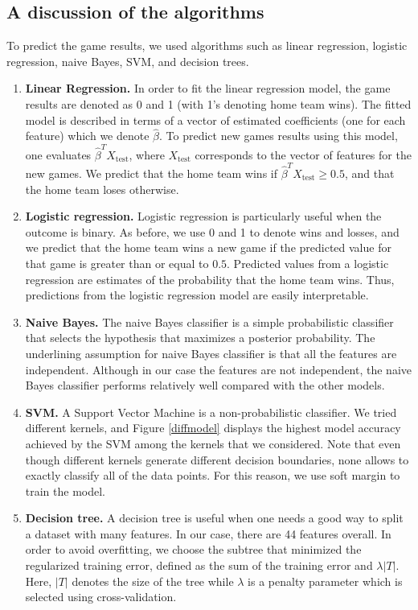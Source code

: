 \documentclass{article} %
\begin{document}
	\subsection{A discussion of the algorithms}
	To predict the game results, we used algorithms such as linear regression, logistic regression, naive Bayes, SVM, and decision trees.
	\begin{enumerate}
	\item \textbf{Linear Regression.}
          In order to fit the linear regression model, the game results are denoted as 0 and 1 (with 1's denoting home team wins). The fitted model is described in terms of a vector  of estimated coefficients (one for each feature) which we denote $\hat \beta$. To predict new games results using this model, one evaluates $\hat \beta^{T} X_{\text{test}}$, where $X_{\text{test}}$ corresponds to the vector of features for the new games. We predict that the home team wins if $\hat \beta^{T} X_{\text{test}} \ge 0.5$, and that the home team loses otherwise.
	\item \textbf{Logistic regression.} Logistic regression is particularly useful when the outcome is binary. As before, we use 0 and 1 to denote wins and losses, and we predict that the home team wins a new game if the predicted value for that game is greater than or equal to $0.5$. Predicted values from a logistic regression are estimates of the probability that the home team wins. Thus, predictions from the logistic regression model are easily interpretable.
	\item \textbf{Naive Bayes.} The naive Bayes classifier is a simple probabilistic classifier that selects the hypothesis that maximizes a posterior probability. The underlining assumption for naive Bayes classifier is that all the features are independent. Although in our case the features are not independent, the naive Bayes classifier performs relatively well compared with the other models. 
	\item \textbf{SVM.}  A Support Vector Machine is a non-probabilistic classifier. We tried different kernels, and Figure \ref{diffmodel} displays the highest model accuracy achieved by the SVM among the kernels that we considered. Note that even though different kernels generate different decision boundaries, none allows to exactly classify all of the data points. For this reason, we use soft margin to train the model.
	\item \textbf{Decision tree.} A decision tree is useful when one needs a good way to split a dataset with many features. In our case, there are 44 features overall. In order to avoid overfitting, we choose the subtree that minimized the regularized training error, defined as the sum of the training error and $\lambda |T|$. Here, $|T|$ denotes the size	of the tree while $\lambda$ is a penalty parameter which is selected using cross-validation.
	\end{enumerate}
\end{document}
